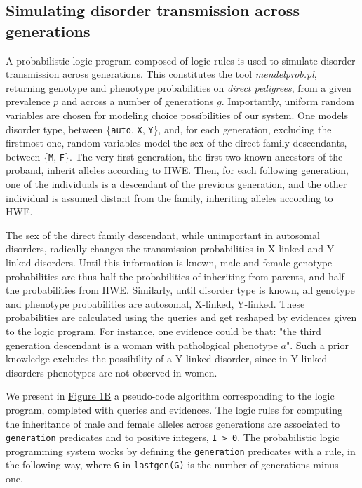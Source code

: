 \documentclass{eptcs}
\begin{document}
\subsection*{Simulating disorder transmission across generations}

A probabilistic logic program composed of logic rules is used to simulate disorder transmission across generations. This constitutes the tool \textit{mendelprob.pl}, returning genotype and phenotype probabilities on \textit{direct pedigrees}, from a given  prevalence $p$ and across a number of generations $g$. Importantly, uniform random variables are chosen for modeling choice possibilities of our system. One models disorder type, between \{\texttt{auto}, \texttt{X}, \texttt{Y}\}, and, for each generation, excluding the firstmost one, random variables model the sex of the direct family descendants, between \{\texttt{M}, \texttt{F}\}. The very first generation, the first two known ancestors of the proband, inherit alleles according to HWE. Then, for each following generation, one of the individuals is a descendant of the previous generation, and the other individual is assumed distant from the family, inheriting alleles according to HWE. 

The sex of the direct family descendant, while unimportant in autosomal disorders, radically changes the transmission probabilities in X-linked and Y-linked disorders. Until this information is known, male and female genotype probabilities are thus half the probabilities of inheriting from parents, and half the probabilities from HWE. Similarly, until disorder type is known, all genotype and phenotype probabilities are  autosomal,  X-linked,  Y-linked. These probabilities are calculated using the queries and get reshaped by evidences given to the logic program. For instance, one evidence could be that: "the third generation descendant is a woman with pathological phenotype $a$". Such a prior knowledge excludes the possibility of a Y-linked disorder, since in Y-linked disorders phenotypes are not observed in women.

We present in \hyperref[fig:methods]{Figure 1B} a pseudo-code algorithm corresponding to the logic program, completed with queries and evidences. The logic rules for computing the inheritance of male and female alleles across generations are associated to \texttt{generation} predicates and to positive integers, \texttt{I > 0}. The probabilistic logic programming system works by defining the \texttt{generation} predicates with a rule, in the following way, where \texttt{G} in \texttt{lastgen(G)} is the number of generations minus one.
\end{document}

